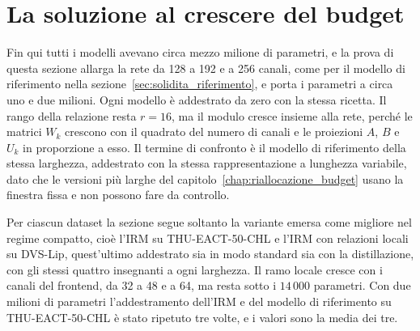 \section{La soluzione al crescere del budget}
\label{sec:capacita_irm}

Fin qui tutti i modelli avevano circa mezzo milione di parametri, e la prova di questa sezione allarga la rete da 128 a 192 e a 256 canali, come per il modello di riferimento nella sezione~\ref{sec:solidita_riferimento}, e porta i parametri a circa uno e due milioni. Ogni modello è addestrato da zero con la stessa ricetta. Il rango della relazione resta $r=16$, ma il modulo cresce insieme alla rete, perché le matrici $W_k$ crescono con il quadrato del numero di canali e le proiezioni $A$, $B$ e $U_k$ in proporzione a esso. Il termine di confronto è il modello di riferimento della stessa larghezza, addestrato con la stessa rappresentazione a lunghezza variabile, dato che le versioni più larghe del capitolo~\ref{chap:riallocazione_budget} usano la finestra fissa e non possono fare da controllo.

Per ciascun dataset la sezione segue soltanto la variante emersa come migliore nel regime compatto, cioè l'IRM su THU-EACT-50-CHL e l'IRM con relazioni locali su DVS-Lip, quest'ultimo addestrato sia in modo standard sia con la distillazione, con gli stessi quattro insegnanti a ogni larghezza. Il ramo locale cresce con i canali del frontend, da 32 a 48 e a 64, ma resta sotto i $14\,000$ parametri. Con due milioni di parametri l'addestramento dell'IRM e del modello di riferimento su THU-EACT-50-CHL è stato ripetuto tre volte, e i valori sono la media dei tre.


